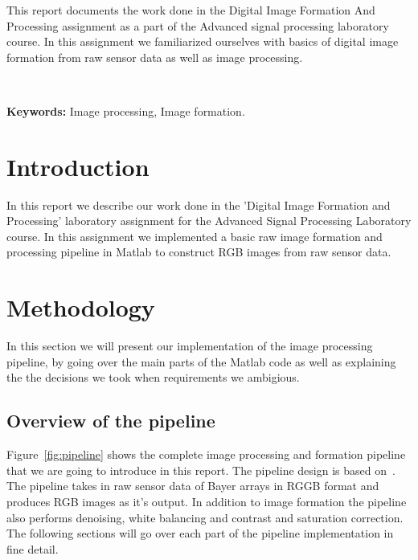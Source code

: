\documentclass[12pt,a4paper,english
]{tunithesis}
\begin{document}
\vspace{0.5cm}


\noindent
This report documents the work done in the Digital Image Formation And Processing assignment as a part of the Advanced signal processing laboratory course. In this assignment we familiarized ourselves with basics of digital image formation from raw sensor data as well as image processing.

~

\noindent\textbf{Keywords:} Image processing, Image formation.





\setcounter{tocdepth}{3}              %
\tableofcontents                      %


\if@twoside
\cleardoublepage
\fi


\renewcommand{\chaptername}{} %


\chapter{Introduction}
\label{ch:intro} 
In this report we describe our work done in the 'Digital Image Formation and Processing' laboratory assignment for the Advanced Signal Processing Laboratory course. In this assignment we implemented a basic raw image formation and processing pipeline in Matlab to construct RGB images from raw sensor data.

\setcounter{page}{1} 

\chapter{Methodology}
\label{sec:methodology}
In this section we will present our implementation of the image processing pipeline, by going over the main parts of the Matlab code as well as explaining the the decisions we took when requirements we ambigious.

\section{Overview of the pipeline}
Figure~\ref{fig:pipeline} shows the complete image processing and formation pipeline that we are going to introduce in this report. The pipeline design is based on~\cite{ramanath2005color}. The pipeline takes in raw sensor data of Bayer arrays in RGGB format and produces RGB images as it's output. In addition to image formation the pipeline also performs denoising, white balancing and contrast and saturation correction.
The following sections will go over each part of the pipeline implementation in fine detail.
\end{document}
